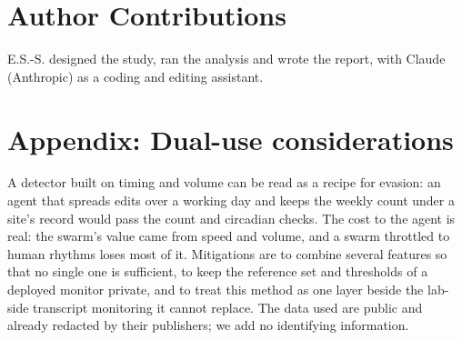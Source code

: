 \documentclass[10pt,a4paper]{article}
\begin{document}
\section*{Author Contributions}
E.S.-S. designed the study, ran the analysis and wrote the report, with Claude (Anthropic) as a coding and editing assistant.




\appendix
\section*{Appendix: Dual-use considerations}
A detector built on timing and volume can be read as a recipe for evasion: an agent that spreads edits over a working day and keeps the weekly count under a site's record would pass the count and circadian checks. The cost to the agent is real: the swarm's value came from speed and volume, and a swarm throttled to human rhythms loses most of it. Mitigations are to combine several features so that no single one is sufficient, to keep the reference set and thresholds of a deployed monitor private, and to treat this method as one layer beside the lab-side transcript monitoring it cannot replace. The data used are public and already redacted by their publishers; we add no identifying information.
\end{document}
